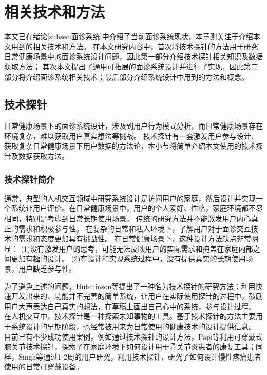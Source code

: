 \chapter{相关技术和方法}
本文已在绪论\ref{subsec:面诊系统}中介绍了当前面诊系统现状，本章则关注于介绍本文用到的相关技术和方法。
在本文研究内容中，首次将技术探针的方法用于研究日常健康场景中的面诊系统设计问题，因此第一部分介绍技术探针相关知识及数据获取方法；
其次本文提出了通用可拓展的面诊系统设计并进行了实现，因此第二部分将介绍面诊系统相关技术；最后部分介绍系统设计中用到的方法和概念。

\section{技术探针}
日常健康场景下的面诊系统设计，涉及到用户行为模式分析，而日常健康场景存在环境复杂，难以获取用户真实想法等挑战。
技术探针有一套激发用户参与设计、获取复杂日常健康场景下用户数据的方法论，本小节将简单介绍本文使用的技术探针及数据获取方法。
\subsection{技术探针简介}

通常，典型的人机交互领域中研究系统设计是访问用户的家庭，然后设计并实现一个系统让用户评价。在日常健康场景中，用户的个人爱好、性格，家庭环境都不尽相同，特别是考虑到日常长期使用场景，
传统的研究方法并不能激发用户内心真正的需求和积极参与性。
在复杂的日常和私人环境下，了解用户对于面诊交互技术的需求和态度更加具有挑战性。
在日常健康场景下，这种设计方法缺点非常明显\cite{Hutchinson2003Technology}：
(1)没有激发用户的思考，可能无法反映用户的实际需求和掩盖在家庭内部之间更加有趣的设计。
(2)在设计和实现系统过程中，没有提供真实的长期使用场景，用户缺乏参与性。

为了避免上述的问题，Hutchinson等\cite{Hutchinson2003Technology}提出了一种名为技术探针的研究方法：利用快速开发出来的、功能并不完善的简单系统，让用户在实际使用探针的过程中，鼓励用户大声表达自己真实的想法，在草稿上画出自己心中的系统，参与设计过程。
在人机交互中，技术探针是一种探索未知事物的工具。基于技术探针的方法主要用于系统设计的早期阶段\cite{turmo2020training}，也经常被用来为日常使用的健康技术的设计提供信息。
目前已有不少成功使用案例，例如通过技术探针的设计方法，Papi等\cite{papi2015knee}利用可穿戴式膝关节技术探针，探索了在家庭环境下如何设计用于骨关节炎患者的康复工具；同样，Singh等\cite{singh2017supporting}通过1-2周的用户研究，利用技术探针，研究了如何设计慢性疼痛患者使用的日常可穿戴设备。


